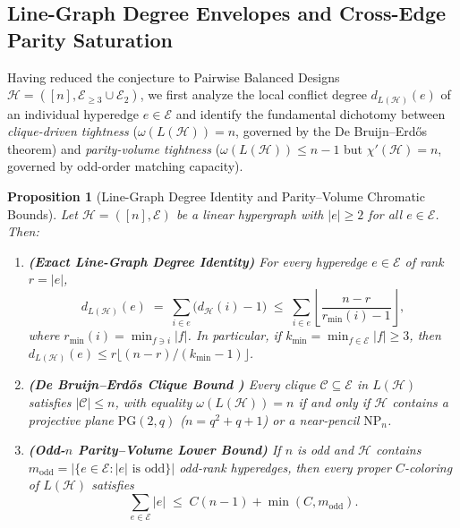 \documentclass[11pt,reqno]{amsart}
\newtheorem{proposition}[theorem]{Proposition}
\theoremstyle{definition}
\theoremstyle{remark}
\begin{document}
\subsection{Line-Graph Degree Envelopes and Cross-Edge Parity Saturation}

Having reduced the conjecture to Pairwise Balanced Designs $\mathcal{H} = ([n], \mathcal{E}_{\ge 3} \cup \mathcal{E}_2)$, we first analyze the local conflict degree $d_{L(\mathcal{H})}(e)$ of an individual hyperedge $e \in \mathcal{E}$ and identify the fundamental dichotomy between \emph{clique-driven tightness} ($\omega(L(\mathcal{H})) = n$, governed by the De Bruijn--Erd\H{o}s theorem) and \emph{parity-volume tightness} ($\omega(L(\mathcal{H})) \le n - 1$ but $\chi'(\mathcal{H}) = n$, governed by odd-order matching capacity).

\begin{proposition}[Line-Graph Degree Identity and Parity--Volume Chromatic Bounds]\label{thm:degree_bounds}
Let $\mathcal{H} = ([n], \mathcal{E})$ be a linear hypergraph with $|e| \ge 2$ for all $e \in \mathcal{E}$. Then:
\begin{enumerate}
  \item[\textup{(i)}] \textbf{(Exact Line-Graph Degree Identity)} For every hyperedge $e \in \mathcal{E}$ of rank $r = |e|$,
  \begin{equation}\label{eq:lg_degree}
    d_{L(\mathcal{H})}(e) \;=\; \sum_{i \in e} \bigl(d_{\mathcal{H}}(i) - 1\bigr) \;\le\; \sum_{i \in e} \left\lfloor \frac{n - r}{r_{\min}(i) - 1} \right\rfloor,
  \end{equation}
  where $r_{\min}(i) = \min_{f \ni i} |f|$. In particular, if $k_{\min} = \min_{f \in \mathcal{E}} |f| \ge 3$, then $d_{L(\mathcal{H})}(e) \le r \lfloor (n - r) / (k_{\min} - 1) \rfloor$.
  \item[\textup{(ii)}] \textbf{(De Bruijn--Erd\H{o}s Clique Bound \cite{DeBruijnErdos1948})} Every clique $\mathcal{C} \subseteq \mathcal{E}$ in $L(\mathcal{H})$ satisfies $|\mathcal{C}| \le n$, with equality $\omega(L(\mathcal{H})) = n$ if and only if $\mathcal{H}$ contains a projective plane $\mathrm{PG}(2, q)$ ($n = q^2 + q + 1$) or a near-pencil $\mathrm{NP}_n$.
  \item[\textup{(iii)}] \textbf{(Odd-$n$ Parity--Volume Lower Bound)} If $n$ is odd and $\mathcal{H}$ contains $m_{\mathrm{odd}} = |\{e \in \mathcal{E} : |e| \text{ is odd}\}|$ odd-rank hyperedges, then every proper $C$-coloring of $L(\mathcal{H})$ satisfies
  \begin{equation}\label{eq:parity_vol}
    \sum_{e \in \mathcal{E}} |e| \;\le\; C(n - 1) + \min(C, m_{\mathrm{odd}}).
  \end{equation}
\end{enumerate}
\end{proposition}
\end{document}
